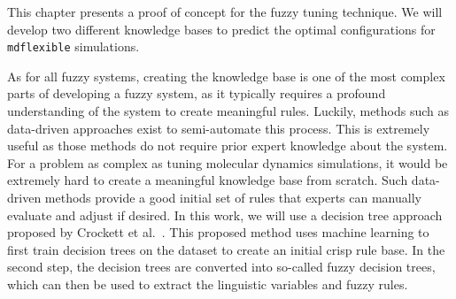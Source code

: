 \newcommand{\crispTreeNode}[2]{
    \begin{tikzpicture}
        \begin{axis}%
            [
                title = {Crisp Split: $#1 \leq #2$},
                width=4.5cm,
                height=3cm,
                axis lines=center,
                xlabel={#1},
                x label style={at={(axis description cs:0.9,-0.1)},anchor=north},
                ylabel=$\mu$,
                y label style={at={(axis description cs:0.5,1)},anchor=south},
                xmin=-5,
                xmax=5,
                xtick={},
                xticklabels= {},
                ytick={},
                yticklabels={},
                extra x ticks={0},
                extra x tick labels={#2},
                ymin=-0.1,
                ymax=1.1,
                samples=50,
                extra y ticks={1},
                every axis plot/.append style={thick}
            ]
            \addplot[red,domain=-5:-0.6] {step(x,0,-1)};
            \addplot[blue,domain=0.6:5] {step(x,0,1)};
            \addplot[red,domain=0.6:5] {step(x,0,-1)};
            \addplot[blue,domain=-5:-0.6] {step(x,0,1)};

            \node[draw,draw=black,circle,inner sep=1pt,minimum width=3pt,thick] at (axis cs:0,1) {};
            \node[draw,draw=black,circle,inner sep=1pt,minimum width=3pt,thick] at (axis cs:0,0) {};

            \node[anchor=center, red] at (axis cs:-2.9,0.6) {$#1 \leq #2$};
            \node[anchor=center, blue] at (axis cs:3.1,0.6) {$#1 > #2$};
        \end{axis}

    \end{tikzpicture}
}



This chapter presents a proof of concept for the fuzzy tuning technique. We will develop two different knowledge bases to predict the optimal configurations for \texttt{\gls{mdflexible}} simulations.

As for all fuzzy systems, creating the knowledge base is one of the most complex parts of developing a fuzzy system, as it typically requires a profound understanding of the system to create meaningful rules. Luckily, methods such as data-driven approaches exist to semi-automate this process. This is extremely useful as those methods do not require prior expert knowledge about the system. For a problem as complex as tuning molecular dynamics simulations, it would be extremely hard to create a meaningful knowledge base from scratch. Such data-driven methods provide a good initial set of rules that experts can manually evaluate and adjust if desired. In this work, we will use a decision tree approach proposed by Crockett et al.~\cite{CROCKETT20062809}. This proposed method uses machine learning to first train decision trees on the dataset to create an initial crisp rule base. In the second step, the decision trees are converted into so-called fuzzy decision trees, which can then be used to extract the linguistic variables and fuzzy rules.

